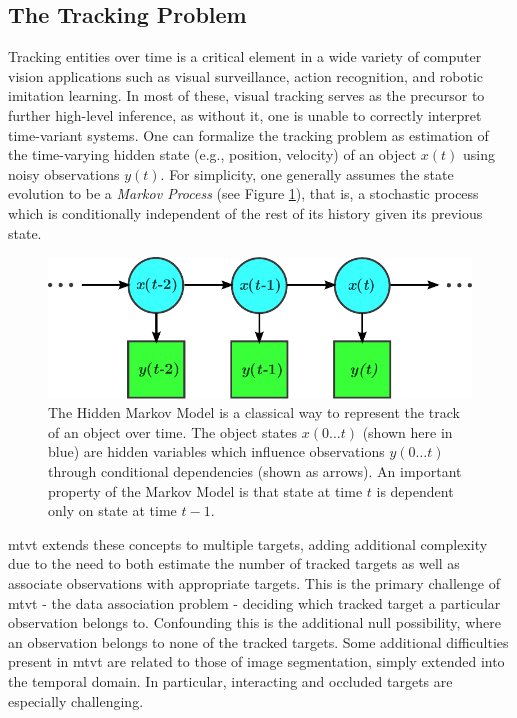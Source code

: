 \subsection{The Tracking Problem}
Tracking entities over time is a critical element in a wide variety of computer vision applications such as visual surveillance, action recognition, and robotic imitation learning. In most of these, visual tracking serves as the precursor to further high-level inference, as without it, one is unable to correctly interpret time-variant systems. One can formalize the tracking problem as estimation of the time-varying hidden state (e.g., position, velocity) of an object $x(t)$ using noisy observations $y(t)$. For simplicity, one generally assumes the state evolution to be a \emph{Markov Process} (see Figure \ref{fig:HMM}), that is, a stochastic process which is conditionally independent of the rest of its history given its previous state.    

\begin{figure}
\centering
\includegraphics[width=0.9\linewidth]{figures/Introduction/HMM.pdf}
\caption[Hidden Markov Model]{The Hidden Markov Model is a classical way to represent the track of an object over time. The object states $x(0\dots t)$ (shown here in blue) are hidden variables which influence observations $y(0\dots t)$ through conditional dependencies (shown as arrows). An important property of the Markov Model is that state at time $t$ is dependent only on state at time $t-1$.}
\label{fig:HMM}
\end{figure}

\gls{mtvt} extends these concepts to multiple targets, adding additional complexity due to the need to both estimate the number of tracked targets as well as associate observations with appropriate targets. This is the primary challenge of \gls{mtvt} - the data association problem - deciding which tracked target a particular observation belongs to. Confounding this is the additional null possibility, where an observation belongs to none of the tracked targets. Some additional difficulties present in \gls{mtvt} are related to those of image segmentation, simply extended into the temporal domain. In particular, interacting and occluded targets are especially challenging.


